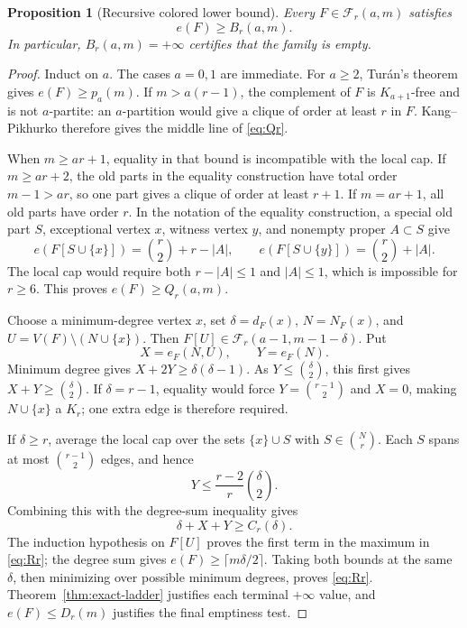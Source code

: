 \documentclass[11pt,reqno,a4paper]{amsart}
\newtheorem{proposition}[theorem]{Proposition}
\theoremstyle{definition}
\theoremstyle{remark}
\begin{document}
\begin{proposition}[Recursive colored lower bound]
\label{prop:recursive-lower-bound}
Every $F\in\mathcal F_r(a,m)$ satisfies
\[
  e(F)\geq B_r(a,m).
\]
In particular, $B_r(a,m)=+\infty$ certifies that the family is empty.
\end{proposition}

\begin{proof}
Induct on $a$. The cases $a=0,1$ are immediate. For $a\geq2$,
Tur\'an's theorem gives $e(F)\geq p_a(m)$. If $m>a(r-1)$, the
complement of $F$ is $K_{a+1}$-free and is not $a$-partite: an
$a$-partition would give a clique of order at least $r$ in $F$.
Kang--Pikhurko therefore gives the middle line of \eqref{eq:Qr}.

When $m\geq ar+1$, equality in that bound is incompatible with the local
cap. If $m\geq ar+2$, the old parts in the equality construction have
total order $m-1>ar$, so one part gives a clique of order at least
$r+1$. If $m=ar+1$, all old parts have order $r$. In the notation of
the equality construction, a special old part $S$, exceptional vertex
$x$, witness vertex $y$, and nonempty proper $A\subset S$ give
\[
 e(F[S\cup\{x\}])=\binom r2+r-|A|,
 \qquad
 e(F[S\cup\{y\}])=\binom r2+|A|.
\]
The local cap would require both $r-|A|\leq1$ and $|A|\leq1$, which
is impossible for $r\geq6$. This proves $e(F)\geq Q_r(a,m)$.

Choose a minimum-degree vertex $x$, set $\delta=d_F(x)$,
$N=N_F(x)$, and $U=V(F)\setminus(N\cup\{x\})$. Then
$F[U]\in\mathcal F_r(a-1,m-1-\delta)$. Put
\[
 X=e_F(N,U),\qquad Y=e_F(N).
\]
Minimum degree gives $X+2Y\geq\delta(\delta-1)$. As
$Y\leq\binom\delta2$, this first gives
$X+Y\geq\binom\delta2$. If $\delta=r-1$, equality would force
$Y=\binom{r-1}{2}$ and $X=0$, making $N\cup\{x\}$ a $K_r$;
one extra edge is therefore required.

If $\delta\geq r$, average the local cap over the sets
$\{x\}\cup S$ with $S\in\binom Nr$. Each $S$ spans at most
$\binom{r-1}{2}$ edges, and hence
\[
  Y\leq\frac{r-2}{r}\binom\delta2.
\]
Combining this with the degree-sum inequality gives
\[
  \delta+X+Y\geq C_r(\delta).
\]
The induction hypothesis on $F[U]$ proves the first term in the maximum
in \eqref{eq:Rr}; the degree sum gives
$e(F)\geq\lceil m\delta/2\rceil$. Taking both bounds at the same
$\delta$, then minimizing over possible minimum degrees, proves
\eqref{eq:Rr}. Theorem~\ref{thm:exact-ladder} justifies each terminal
$+\infty$ value, and $e(F)\leq D_r(m)$ justifies the final emptiness
test.
\end{proof}
\end{document}
